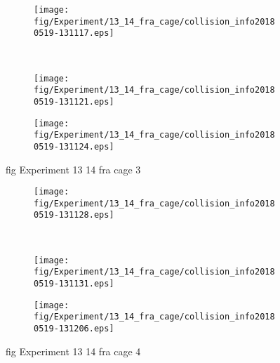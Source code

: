 \begin{figure}[H]
	\centering
	\begin{subfigure}[b]{0.45\textwidth}
		\texttt{[image: fig/Experiment/13\_14\_fra\_cage/collision\_info20180519-131117.eps]}
		\caption{}
		\label{fig:Experiment:13_14_fra_cage:collision_info20180519-131117}
	\end{subfigure}
	~
	\begin{subfigure}[b]{0.45\textwidth}
		\texttt{[image: fig/Experiment/13\_14\_fra\_cage/collision\_info20180519-131121.eps]}
		\caption{}
		\label{fig:Experiment:13_14_fra_cage:collision_info20180519-131121}
	\end{subfigure}

	\begin{subfigure}[b]{0.45\textwidth}
		\texttt{[image: fig/Experiment/13\_14\_fra\_cage/collision\_info20180519-131124.eps]}
		\caption{}
		\label{fig:Experiment:13_14_fra_cage:collision_info20180519-131124}
	\end{subfigure}
	\caption{fig Experiment 13 14 fra cage 3}
	\label{fig:Experiment:13_14_fra_cage:3}
\end{figure}

\begin{figure}[H]
	\centering
	\begin{subfigure}[b]{0.45\textwidth}
		\texttt{[image: fig/Experiment/13\_14\_fra\_cage/collision\_info20180519-131128.eps]}
		\caption{}
		\label{fig:Experiment:13_14_fra_cage:collision_info20180519-131128}
	\end{subfigure}
	~
	\begin{subfigure}[b]{0.45\textwidth}
		\texttt{[image: fig/Experiment/13\_14\_fra\_cage/collision\_info20180519-131131.eps]}
		\caption{}
		\label{fig:Experiment:13_14_fra_cage:collision_info20180519-131131}
	\end{subfigure}

	\begin{subfigure}[b]{0.45\textwidth}
		\texttt{[image: fig/Experiment/13\_14\_fra\_cage/collision\_info20180519-131206.eps]}
		\caption{}
		\label{fig:Experiment:13_14_fra_cage:collision_info20180519-131206}
	\end{subfigure}
	\caption{fig Experiment 13 14 fra cage 4}
	\label{fig:Experiment:13_14_fra_cage:4}
\end{figure}

